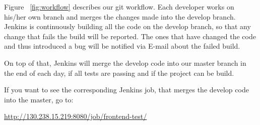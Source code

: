 \documentclass[11pt]{article}
\newenvironment{myindentpar}[1]%
 {\begin{list}{}%
         {\setlength{\leftmargin}{#1}}%
         \item[]%
 }
 {\end{list}}
\newcommand{\fig}[1]{Figure ~\ref{fig:#1}}
\begin{document}
\fig{workflow} describes our git workflow.
Each developer works on his/her own branch and merges 
the changes made into the develop branch. Jenkins is continuously
building all the code on the develop branch, so that any change that 
fails the build will be reported. The ones that have changed the code
and thus introduced a bug will be notified via E-mail about
the failed build.

On top of that, Jenkins will merge the develop code into our
master branch in the end of each day, if all tests are passing and
if the project can be build.

If you want to see the corresponding Jenkins job, that
merges the develop code into the master, go to:

\begin{myindentpar}{1cm}
\url{http://130.238.15.219:8080/job/frontend-test/}
\end{myindentpar}
\end{document}
